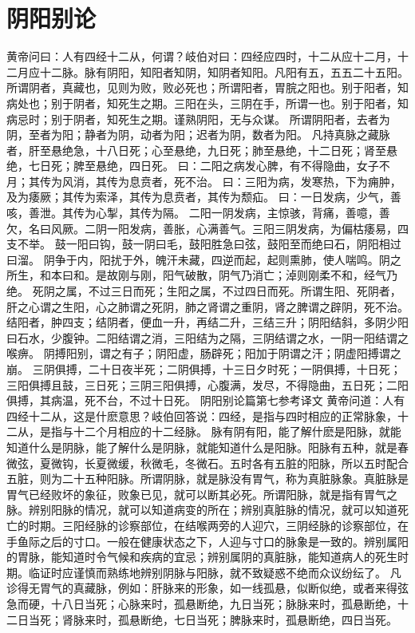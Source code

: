 \documentclass[a4paper,12pt,UTF8,twoside]{ctexbook}
\begin{document}
\chapter{阴阳别论}
黄帝问曰：人有四经十二从，何谓？岐伯对曰：四经应四时，十二从应十二月，十二月应十二脉。脉有阴阳，知阳者知阴，知阴者知阳。凡阳有五，五五二十五阳。所谓阴者，真藏也，见则为败，败必死也；所谓阳者，胃脘之阳也。别于阳者，知病处也；别于阴者，知死生之期。三阳在头，三阴在手，所谓一也。别于阳者，知病忌时；别于阴者，知死生之期。谨熟阴阳，无与众谋。
所谓阴阳者，去者为阴，至者为阳；静者为阴，动者为阳；迟者为阴，数者为阳。
凡持真脉之藏脉者，肝至悬绝急，十八日死；心至悬绝，九日死；肺至悬绝，十二日死；肾至悬绝，七日死；脾至悬绝，四日死。
曰：二阳之病发心脾，有不得隐曲，女子不月；其传为风消，其传为息贲者，死不治。
曰：三阳为病，发寒热，下为痈肿，及为痿厥；其传为索泽，其传为息贲者，其传为颓疝。
曰：一日发病，少气，善咳，善泄。其传为心掣，其传为隔。
二阳一阴发病，主惊骇，背痛，善噫，善欠，名曰风厥。二阴一阳发病，善胀，心满善气。三阳三阴发病，为偏枯痿易，四支不举。
鼓一阳曰钩，鼓一阴曰毛，鼓阳胜急曰弦，鼓阳至而绝曰石，阴阳相过曰溜。
阴争于内，阳扰于外，魄汗未藏，四逆而起，起则熏肺，使人喘鸣。阴之所生，和本曰和。是故刚与刚，阳气破散，阴气乃消亡；淖则刚柔不和，经气乃绝。
死阴之属，不过三日而死；生阳之属，不过四日而死。所谓生阳、死阴者，肝之心谓之生阳，心之肺谓之死阴，肺之肾谓之重阴，肾之脾谓之辟阴，死不治。
结阳者，肿四支；结阴者，便血一升，再结二升，三结三升；阴阳结斜，多阴少阳曰石水，少腹钟。二阳结谓之消，三阳结为之隔，三阴结谓之水，一阴一阳结谓之喉痹。
阴搏阳别，谓之有子；阴阳虚，肠辟死；阳加于阴谓之汗；阴虚阳搏谓之崩。
三阴俱搏，二十日夜半死；二阴俱搏，十三日夕时死；一阴俱搏，十日死；三阳俱搏且鼓，三日死；三阴三阳俱搏，心腹满，发尽，不得隐曲，五日死；二阳俱搏，其病温，死不台，不过十日死。
阴阳别论篇第七参考译文
黄帝问道：人有四经十二从，这是什麽意思？岐伯回答说：四经，是指与四时相应的正常脉象，十二从，是指与十二个月相应的十二经脉。
脉有阴有阳，能了解什麽是阳脉，就能知道什么是阴脉，能了解什么是阴脉，就能知道什么是阳脉。阳脉有五种，就是春微弦，夏微钩，长夏微缓，秋微毛，冬微石。五时各有五脏的阳脉，所以五时配合五脏，则为二十五种阳脉。所谓阴脉，就是脉没有胃气，称为真脏脉象。真脏脉是胃气已经败坏的象征，败象已见，就可以断其必死。所谓阳脉，就是指有胃气之脉。辨别阳脉的情况，就可以知道病变的所在；辨别真脏脉的情况，就可以知道死亡的时期。三阳经脉的诊察部位，在结喉两旁的人迎穴，三阴经脉的诊察部位，在手鱼际之后的寸口。一般在健康状态之下，人迎与寸口的脉象是一致的。辨别属阳的胃脉，能知道时令气候和疾病的宜忌；辨别属阴的真脏脉，能知道病人的死生时期。临证时应谨慎而熟练地辨别阴脉与阳脉，就不致疑惑不绝而众议纷纭了。
凡诊得无胃气的真藏脉，例如：肝脉来的形象，如一线孤悬，似断似绝，或者来得弦急而硬，十八日当死；心脉来时，孤悬断绝，九日当死；脉脉来时，孤悬断绝，十二日当死；肾脉来时，孤悬断绝，七日当死；脾脉来时，孤悬断绝，四日当死。
\end{document}
